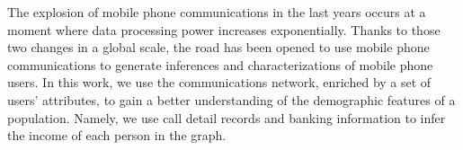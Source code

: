 The explosion of mobile phone communications in the last years occurs at a moment where data processing power increases exponentially.  Thanks to those two changes in a global scale, the road has been opened to use mobile phone communications to generate inferences and characterizations of mobile phone users.
In this work, we use the communications network, enriched by a set of users' attributes, to gain a better understanding of the demographic features of a population. Namely, we use 
call detail records and banking information to infer the income of each person in the graph.


